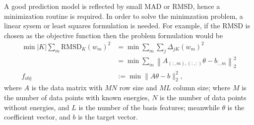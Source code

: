 \documentclass[12pt]{article}
\def\D{\displaystyle}
\begin{document}
\iffalse
In order to see the general pattern of (\refeq{eq:delta}), let us see a simple example with $j = 1$, $|K| = 2$, and $L = 2$; and using simplified expressions by omitting the arguments
\begin{equation*}
    \begin{split}
        D_k &:= D_k(w), \\
        S_K &:= S_K(w), \\
        \phi_{k,l} &:= \phi_{k,l}(w),
    \end{split}
\end{equation*}
hence
\begin{equation}
    \begin{split}
        \Delta_{1,K}(w)&:= \frac{\D \frac{ E_1 + \theta_{1,1}\phi_{1,1} + \theta_{1,2}\phi_{1,2}}{D_1S_K} + \frac{E_2 + \theta_{2,1}\phi_{2,1} + \theta_{2,2}\phi_{2,2}}{D_2S_K} - (E_1 + \theta_{1,1}\phi_{1,1} + \theta_{1,2}\phi_{1,2})}{D_1S_K-1} \\
        &= \D \frac{ E_1 + \theta_{1,1}\phi_{1,1} + \theta_{1,2}\phi_{1,2}}{D_1S_K(D_1S_K-1)} + \frac{E_2 + \theta_{2,1}\phi_{2,1} + \theta_{2,2}\phi_{2,2}}{D_2S_K(D_1S_K-1)} - \frac{(E_1 + \theta_{1,1}\phi_{1,1} + \theta_{1,2}\phi_{1,2})}{D_1S_K-1} \\
        &= \dots
    \end{split}
\end{equation}
\fi

A good prediction model is reflected by small MAD or RMSD, hence a minimization routine is required. In order to solve the minimzation problem, a linear sysem or least squares formulation is needed. For example, if the RMSD is chosen as the objective function then the problem formulation would be
\begin{equation}
    \label{eq:min}
    \begin{split}
        \min |K| \sum_m \text{RMSD}_K(w_m)^2 &= \min \sum_m \sum_j \Delta_{jK}(w_m)^2 \\
        &= \min \sum_m \left\| A_{(:,m),(:,:)}\theta - b_{:,m}\right\|_2^2 \\
        f_{\text{obj}} &:= \min \|A \theta - b\|_2^2,
    \end{split}
\end{equation}
where $A$ is the data matrix with $MN$ row size and $ML$ column size; where $M$ is the number of data points with known energies, $N$ is the number of data points without energies, and $L$ is the number of the basis features; meanwhile $\theta$ is the coefficient vector, and $b$ is the target vector.
\end{document}
